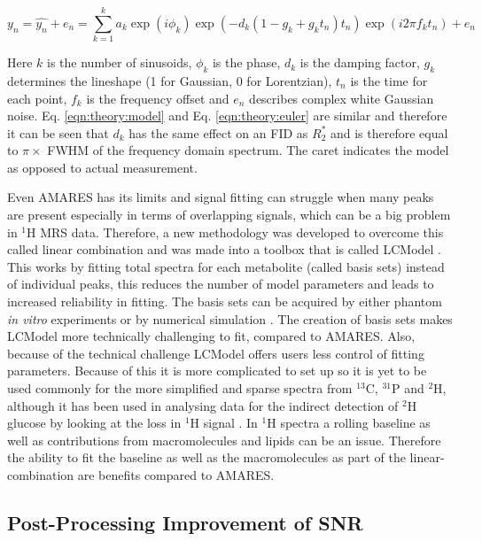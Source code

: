 \begin{equation}
    y_n = \hat{y_n} + e_n = \sum_{k=1}^{k}a_k\exp(i\phi_k)\exp(-d_k(1-g_k+g_kt_n)t_n)\exp(i2\pi f_kt_n) + e_n
    \label{eqn:theory:model}
\end{equation}

\noindent Here $k$ is the number of sinusoids, $\phi_k$ is the phase, $d_k$ is the damping factor, $g_k$ determines the lineshape (1 for Gaussian, 0 for Lorentzian), $t_n$ is the time for each point, $f_k$ is the frequency offset and $e_n$ describes complex white Gaussian noise. Eq. \ref{eqn:theory:model} and Eq. \ref{eqn:theory:euler} are similar and therefore it can be seen that $d_k$ has the same effect on an \ac{FID} as $R_2^*$ and is therefore equal to $\pi \times$ \ac{FWHM} of the frequency domain spectrum. The caret indicates the model as opposed to actual measurement.

Even \ac{AMARES} has its limits and signal fitting can struggle when many peaks are present especially in terms of overlapping signals, which can be a big problem in $^1$H \ac{MRS} data. Therefore, a new methodology was developed to overcome this called linear combination and was made into a toolbox that is called LCModel \cite{Provencher1993EstimationSpectra}. This works by fitting total spectra for each metabolite (called basis sets) instead of individual peaks, this reduces the number of model parameters and leads to increased reliability in fitting. The basis sets can be acquired by either phantom \textit{in vitro} experiments or by numerical simulation \cite{Near2021PreprocessingRecommendations}. The creation of basis sets makes LCModel more technically challenging to fit, compared to \ac{AMARES}. Also, because of the technical challenge LCModel offers users less control of fitting parameters. Because of this it is more complicated to set up so it is yet to be used commonly for the more simplified and sparse spectra from $^{13}$C, $^{31}$P and $^2$H, although it has been used in analysing data for the indirect detection of $^2$H glucose by looking at the loss in $^1$H signal \cite{Rich20201HVivo,Cember2022IntegratingHumans,Niess2023Reproducibility3T}. In $^1$H spectra a rolling baseline as well as contributions from macromolecules and lipids can be an issue. Therefore the ability to fit the baseline as well as the macromolecules as part of the linear-combination are benefits compared to \ac{AMARES}.

\subsection{Post-Processing Improvement of SNR}
\label{Chap:Theory:denoise}

